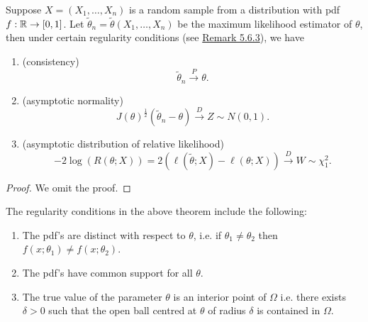 \documentclass[11pt,fleqn]{book} %
\begin{document}
\begin{theorem} \label{thm:562}
Suppose \(X = (X_1, \ldots, X_n)\) is a random sample from a distribution with pdf \(f: \mathbb{R}\rightarrow[0, 1]\). Let \(\tilde{\theta}_n = \tilde{\theta}(X_1, \ldots, X_n)\) be the maximum likelihood estimator of \(\theta\), then under certain regularity conditions (see \hyperref[rmk:563]{Remark 5.6.3}), we have
\begin{enumerate}
\item (consistency) 
\[
\tilde{\theta}_n \xrightarrow{P}\theta.
\]
\item (asymptotic normality)
\[
J(\theta)^{\frac12}(\tilde{\theta}_n - \theta) \xrightarrow{D} Z \sim N(0, 1).
\]
\item (asymptotic distribution of relative likelihood)
\[
-2\log(R(\theta; X)) = 2(\ell(\tilde{\theta}; X) - \ell(\theta; X)) \xrightarrow{D} W \sim \chi^2_1.
\]
\end{enumerate}
\end{theorem}
\begin{proof} We omit the proof.\end{proof}

\begin{remark} \label{rmk:563}
The regularity conditions in the above theorem include the following:
\begin{enumerate}
\item The pdf's are distinct with respect to \(\theta\), i.e. if \(\theta_1 \neq \theta_2\) then \(f(x; \theta_1) \neq f(x; \theta_2)\).
\item The pdf's have common support for all \(\theta\).
\item The true value of the parameter \(\theta\) is an interior point of \(\Omega\) i.e. there exists \(\delta > 0\) such that the open ball centred at \(\theta\) of radius \(\delta\) is contained in \(\Omega\).
\end{enumerate}
\end{remark}
\end{document}
